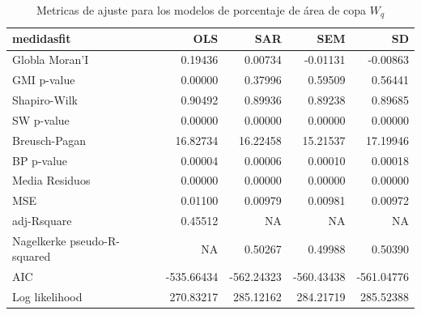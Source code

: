 \documentclass[12pt,a4paper,oneside, openany]{book}
\theoremstyle{definition}
\theoremstyle{definition}
\theoremstyle{definition}
\theoremstyle{remark}
\begin{document}
\begin{table}[H]

\caption{\label{tab:tabla-comp-modelos-copaap-wq}Metricas de ajuste para los modelos de porcentaje de área de copa $W_q$}
\centering
\begin{tabular}{lrrrr}
\toprule
medidasfit & OLS & SAR & SEM & SD\\
\midrule
Globla Moran'I & 0.19436 & 0.00734 & -0.01131 & -0.00863\\
GMI p-value & 0.00000 & 0.37996 & 0.59509 & 0.56441\\
Shapiro-Wilk & 0.90492 & 0.89936 & 0.89238 & 0.89685\\
SW p-value & 0.00000 & 0.00000 & 0.00000 & 0.00000\\
Breusch-Pagan & 16.82734 & 16.22458 & 15.21537 & 17.19946\\
\addlinespace
BP p-value & 0.00004 & 0.00006 & 0.00010 & 0.00018\\
Media Residuos & 0.00000 & 0.00000 & 0.00000 & 0.00000\\
MSE & 0.01100 & 0.00979 & 0.00981 & 0.00972\\
adj-Rsquare & 0.45512 & NA & NA & NA\\
Nagelkerke pseudo-R-squared & NA & 0.50267 & 0.49988 & 0.50390\\
\addlinespace
AIC & -535.66434 & -562.24323 & -560.43438 & -561.04776\\
Log likelihood & 270.83217 & 285.12162 & 284.21719 & 285.52388\\
\bottomrule
\end{tabular}
\end{table}
\end{document}

